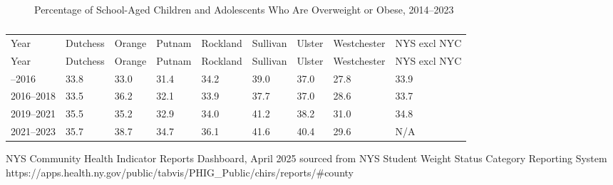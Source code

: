 \documentclass[
  english,
  letterpaper,
]{report}
\begin{document}
\begin{figure}


\caption{\label{fig-child-oando-percent}Percentage of School-Aged
Children and Adolescents Who Are Overweight or Obese, 2014--2023}

\end{figure}%

\begin{longtable}[]{@{}lllllllll@{}}

\caption{\label{tbl-child-oando-percent}Percentage of School-Aged
Children and Adolescents Who Are Overweight or Obese, 2014--2023}

\tabularnewline

\caption{}\label{T_27cfc}\tabularnewline
\toprule\noalign{}
Year & Dutchess & Orange & Putnam & Rockland & Sullivan & Ulster &
Westchester & NYS excl NYC \\
\midrule\noalign{}
\endfirsthead
\toprule\noalign{}
Year & Dutchess & Orange & Putnam & Rockland & Sullivan & Ulster &
Westchester & NYS excl NYC \\
\midrule\noalign{}
\endhead
\bottomrule\noalign{}
\endlastfoot
2014--2016 & 33.8 & 33.0 & 31.4 & 34.2 & 39.0 & 37.0 & 27.8 & 33.9 \\
2016--2018 & 33.5 & 36.2 & 32.1 & 33.9 & 37.7 & 37.0 & 28.6 & 33.7 \\
2019--2021 & 35.5 & 35.2 & 32.9 & 34.0 & 41.2 & 38.2 & 31.0 & 34.8 \\
2021--2023 & 35.7 & 38.7 & 34.7 & 36.1 & 41.6 & 40.4 & 29.6 & N/A \\

\end{longtable}

\begin{tcolorbox}[enhanced jigsaw, breakable, leftrule=.75mm, title=\textcolor{quarto-callout-note-color}{\faInfo}\hspace{0.5em}{Source}, bottomrule=.15mm, opacityback=0, left=2mm, colback=white, bottomtitle=1mm, coltitle=black, colbacktitle=quarto-callout-note-color!10!white, colframe=quarto-callout-note-color-frame, opacitybacktitle=0.6, toptitle=1mm, titlerule=0mm, arc=.35mm, rightrule=.15mm, toprule=.15mm]

NYS Community Health Indicator Reports Dashboard, April 2025 sourced
from NYS Student Weight Status Category Reporting System
https://apps.health.ny.gov/public/tabvis/PHIG\_Public/chirs/reports/\#county

\end{tcolorbox}
\end{document}
